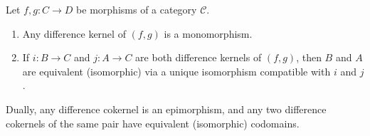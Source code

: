 Let $f, g : C \to D$ be morphisms of a category $\mathcal{C}$.
\begin{enumerate}
\item[(i)] Any difference kernel of $(f, g)$ is a monomorphism.
\item[(ii)] If $i : B \to C$ and $j : A \to C$ are both difference kernels of $(f, g)$, then $B$ and $A$ are equivalent (isomorphic) via a unique isomorphism compatible with $i$ and $j$.
\end{enumerate}
Dually, any difference cokernel is an epimorphism, and any two difference cokernels of the same pair have equivalent (isomorphic) codomains.

